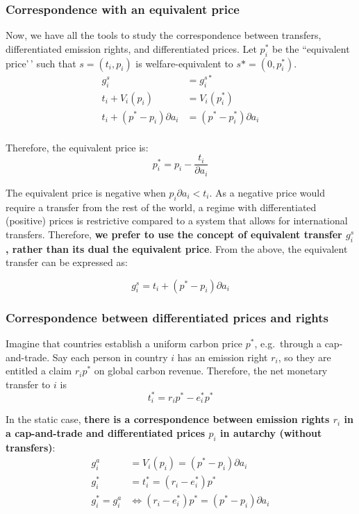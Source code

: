 \documentclass[
  letterpaper,
  DIV=11,
  numbers=noendperiod]{scrartcl}
\begin{document}
\subsubsection{Correspondence with an equivalent
price}\label{correspondence-with-an-equivalent-price}

Now, we have all the tools to study the correspondence between
transfers, differentiated emission rights, and differentiated prices.
Let \(p^*_i\) be the ``equivalent price'\,' such that \(s=(t_i, p_i)\)
is welfare-equivalent to \(s*=(0, p^*_i)\). \[\begin{aligned}
g^s_i &= g^{s*}_i \\
t_i + V_i(p_i) &= V_i(p^*_i) \\
t_i + (p^* - p_i) \partial a_i &= (p^*- p^*_i) \partial a_i \\
\end{aligned}\]

Therefore, the equivalent price is:
\[p^*_i = p_i - \frac{t_i}{\partial a_i} \]

The equivalent price is negative when \(p_i \partial a_i < t_i\). As a
negative price would require a transfer from the rest of the world, a
regime with differentiated (positive) prices is restrictive compared to
a system that allows for international transfers. Therefore, \textbf{we
prefer to use the concept of equivalent transfer \(g^s_i\), rather than
its dual the equivalent price}. From the above, the equivalent transfer
can be expressed as:

\[g^s_i = t_i + (p^* - p_i) \partial a_i\]

\subsubsection{Correspondence between differentiated prices and
rights}\label{correspondence-between-differentiated-prices-and-rights}

Imagine that countries establish a uniform carbon price \(p^*\),
e.g.~through a cap-and-trade. Say each person in country \(i\) has an
emission right \(r_i\), so they are entitled a claim \(r_i p^*\) on
global carbon revenue. Therefore, the net monetary transfer to \(i\) is
\[t^*_i = r_i p^* - e^*_i p^*\]

In the static case, \textbf{there is a correspondence between emission
rights \(r_i\) in a cap-and-trade and differentiated prices \(p_i\) in
autarchy (without transfers)}: \[\begin{aligned}
g^a_i &= V_i(p_i) = (p^* - p_i) \partial a_i \\
g^*_i &= t^*_i = (r_i - e^*_i) p^* \\
g^*_i = g^a_i &\Leftrightarrow (r_i - e^*_i) p^* = (p^* - p_i) \partial a_i
\end{aligned}\]
\end{document}
